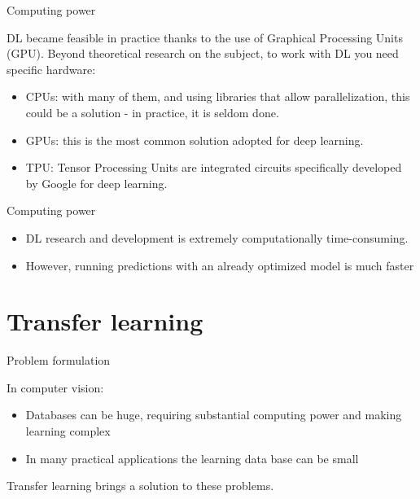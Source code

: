 \documentclass[xcolor=pdftex,dvipsnames,table,mathserif]{beamer}
\begin{document}
\begin{frame}{Computing power}

  DL became feasible in practice thanks to the use of Graphical Processing Units (GPU). Beyond theoretical research on the subject, to work with DL you need specific hardware:
  \begin{itemize}
  \item CPUs: with many of them, and using libraries that allow parallelization, this could be a solution - in practice, it is seldom done.
  \item GPUs: this is the most common solution adopted for deep learning.
  \item TPU: Tensor Processing Units are integrated circuits specifically developed by Google for deep learning.
  \end{itemize}

\end{frame}

\begin{frame}{Computing power}

  \begin{alertblock}{}
    \begin{itemize}
    \item   DL research and development is extremely computationally time-consuming.
    \item   However, running predictions with an already optimized model is much faster
    \end{itemize}
  \end{alertblock}
\end{frame}


\section{Transfer learning}

\begin{frame}{Problem formulation}

  In computer vision:
\begin{itemize}
\item Databases can be huge, requiring substantial computing power and making learning complex
\item In many practical applications the learning data base can be small
\end{itemize}

Transfer learning brings a solution to these problems.

\end{frame}
\end{document}
